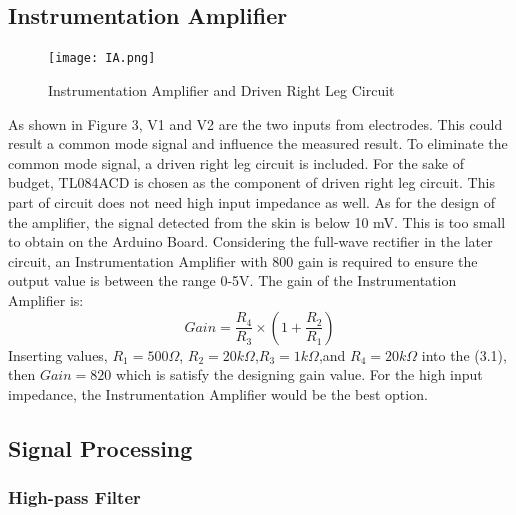 \documentclass[12pt]{article}
\begin{document}
    
    \subsection{Instrumentation Amplifier}
    \paragraph{}
    \begin{figure}[H]
            \centering
            \texttt{[image: IA.png]}
            \caption{Instrumentation Amplifier and Driven Right Leg Circuit}
        \end{figure}
    As shown in Figure 3, V1 and V2 are the two inputs from electrodes. This could result a common mode signal and influence the measured result. To eliminate the common mode signal, a driven right leg circuit is included. For the sake of budget, TL084ACD is chosen as the component of driven right leg circuit. This part of circuit does not need high input impedance as well. As for the design of the amplifier, the signal detected from the skin is below 10 mV. This is too small to obtain on the Arduino Board. Considering the full-wave rectifier in the later circuit, an Instrumentation Amplifier with 800 gain is required to ensure the output value is between the range 0-5V. The gain of the Instrumentation Amplifier is:
    \begin{equation}
    Gain = \frac{R_4}{R_3}\times \left ( 1+\frac{R_2}{R_1} \right )
    \end{equation}
    Inserting values, $R_1=500\Omega$, $R_2=20k\Omega$,$R_3=1k\Omega$,and $R_4=20k\Omega$ into the (3.1), then $Gain=820$ which is satisfy the designing gain value. For the high input impedance, the Instrumentation Amplifier would be the best option.
    
    
    \subsection{Signal Processing}
    \subsubsection{High-pass Filter}
\end{document}

